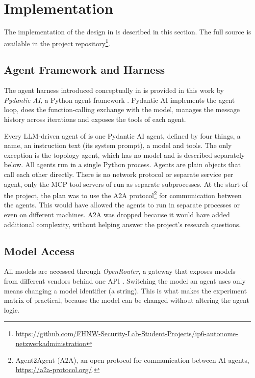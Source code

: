 \section{Implementation}
\label{sec:implementation}
The implementation of the design in  is described in this section. The full source is available in the
project repository\footnote{\url{https://github.com/FHNW-Security-Lab-Student-Projects/ip6-autonome-netzwerkadministration}}.

\subsection{Agent Framework and Harness}
\label{sec:impl-framework}
The agent harness introduced conceptually in  is provided in this work by
\emph{Pydantic AI}, a Python agent framework \parencite{pydantic_ai}. Pydantic AI implements the agent loop,
does the function-calling exchange with the model, manages the message history across iterations and
exposes the tools of each agent.

Every LLM-driven agent of  is one Pydantic AI agent, defined by four things, a
name, an instruction text (its system prompt), a model and tools. The only exception is the topology
agent, which has no model and is described separately below. All agents run in a
single Python process. Agents are plain objects that call each other directly. There is no network protocol
or separate service per agent, only the MCP tool servers of  run as separate
subprocesses. At the start of the project, the plan was to use the A2A
protocol\footnote{Agent2Agent (A2A), an open protocol for communication between AI agents,
\url{https://a2a-protocol.org/}.} for communication between the agents. This would have allowed the agents
to run in separate processes or even on different machines. A2A was dropped because it would have added
additional complexity, without helping answer the project's research questions.

\subsection{Model Access}
\label{sec:impl-models}
All models are accessed through \emph{OpenRouter}, a gateway that exposes models from different vendors
behind one API \parencite{openrouter}. Switching the model an agent uses only means changing a
model identifier (a string). This is what makes the experiment matrix of
 practical, because the model can be changed without altering the agent logic.

